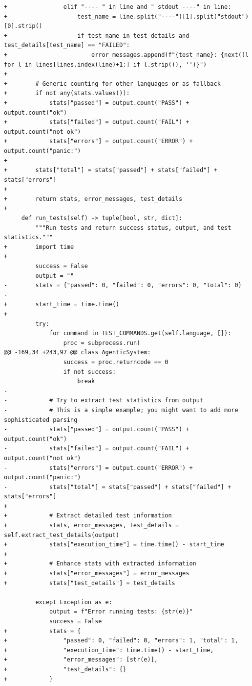 \documentclass{article} %
\begin{document}
\begin{lstlisting}[style=diffstyle]
+                elif "---- " in line and " stdout ----" in line:
+                    test_name = line.split("----")[1].split("stdout")[0].strip()
+                    if test_name in test_details and test_details[test_name] == "FAILED":
+                        error_messages.append(f"{test_name}: {next((l for l in lines[lines.index(line)+1:] if l.strip()), '')}")
+
+        # Generic counting for other languages or as fallback
+        if not any(stats.values()):
+            stats["passed"] = output.count("PASS") + output.count("ok")
+            stats["failed"] = output.count("FAIL") + output.count("not ok")
+            stats["errors"] = output.count("ERROR") + output.count("panic:")
+            
+        stats["total"] = stats["passed"] + stats["failed"] + stats["errors"]
+        
+        return stats, error_messages, test_details
+
     def run_tests(self) -> tuple[bool, str, dict]:
         """Run tests and return success status, output, and test statistics."""
+        import time
+        
         success = False
         output = ""
-        stats = {"passed": 0, "failed": 0, "errors": 0, "total": 0}
-
+        start_time = time.time()
+        
         try:
             for command in TEST_COMMANDS.get(self.language, []):
                 proc = subprocess.run(
@@ -169,34 +243,97 @@ class AgenticSystem:
                 success = proc.returncode == 0
                 if not success:
                     break
-
-            # Try to extract test statistics from output
-            # This is a simple example; you might want to add more sophisticated parsing
-            stats["passed"] = output.count("PASS") + output.count("ok")
-            stats["failed"] = output.count("FAIL") + output.count("not ok")
-            stats["errors"] = output.count("ERROR") + output.count("panic:")
-            stats["total"] = stats["passed"] + stats["failed"] + stats["errors"]
+            
+            # Extract detailed test information
+            stats, error_messages, test_details = self.extract_test_details(output)
+            stats["execution_time"] = time.time() - start_time
+            
+            # Enhance stats with extracted information
+            stats["error_messages"] = error_messages
+            stats["test_details"] = test_details
             
         except Exception as e:
             output = f"Error running tests: {str(e)}"
             success = False
+            stats = {
+                "passed": 0, "failed": 0, "errors": 1, "total": 1,
+                "execution_time": time.time() - start_time,
+                "error_messages": [str(e)],
+                "test_details": {}
+            }
 

\end{lstlisting}
\end{document}

